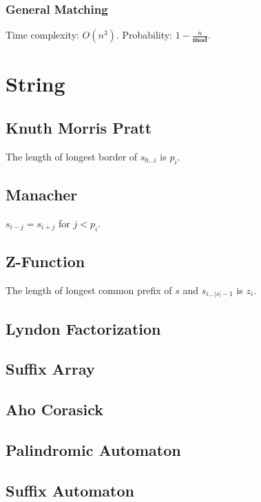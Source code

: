 \documentclass{article}
\begin{document}
        \subsubsection{General Matching}
            Time complexity: $O(n^3)$. Probability: $1-\displaystyle\frac n{\textbf{mod}}$.
            
\section{String}
    \subsection{Knuth Morris Pratt}
        The length of longest border of $s_{0\dots i}$ is $p_i$.
        
    \subsection{Manacher}
        $s_{i-j}=s_{i+j}$ for $j<p_i$.
        
    \subsection{Z-Function}
        The length of longest common prefix of $s$ and $s_{i\dots|s|-1}$ is $z_i$.
        
    \subsection{Lyndon Factorization}
        
    \subsection{Suffix Array}
        
    \subsection{Aho Corasick}
        
    \subsection{Palindromic Automaton}
        
    \subsection{Suffix Automaton}
        
\end{document}
